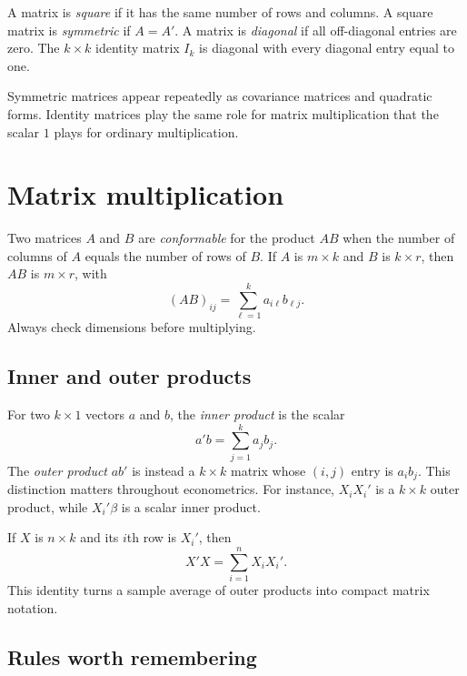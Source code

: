 \begin{definition}
A matrix is \emph{square} if it has the same number of rows and columns.  A
square matrix is \emph{symmetric} if $A=A'$.  A matrix is \emph{diagonal} if
all off-diagonal entries are zero.  The $k\times k$ identity matrix $I_k$ is
diagonal with every diagonal entry equal to one.
\end{definition}

Symmetric matrices appear repeatedly as covariance matrices and quadratic
forms.  Identity matrices play the same role for matrix multiplication that
the scalar $1$ plays for ordinary multiplication.

\section{Matrix multiplication}

Two matrices $A$ and $B$ are \emph{conformable} for the product $AB$ when the
number of columns of $A$ equals the number of rows of $B$.  If $A$ is
$m\times k$ and $B$ is $k\times r$, then $AB$ is $m\times r$, with
\begin{equation}
\label{eq:matrix-product}
  (AB)_{ij}=\sum_{\ell=1}^{k}a_{i\ell}b_{\ell j}.
\end{equation}
Always check dimensions before multiplying.

\subsection{Inner and outer products}

For two $k\times1$ vectors $a$ and $b$, the \emph{inner product} is the
scalar
\[
  a'b=\sum_{j=1}^{k}a_jb_j.
\]
The \emph{outer product} $ab'$ is instead a $k\times k$ matrix whose
$(i,j)$ entry is $a_i b_j$.  This distinction matters throughout
econometrics.  For instance, $X_iX_i'$ is a $k\times k$ outer product, while
$X_i'\beta$ is a scalar inner product.

If $X$ is $n\times k$ and its $i$th row is $X_i'$, then
\begin{equation}
\label{eq:xtx-sum}
  X'X=\sum_{i=1}^{n}X_iX_i'.
\end{equation}
This identity turns a sample average of outer products into compact matrix
notation.

\subsection{Rules worth remembering}

